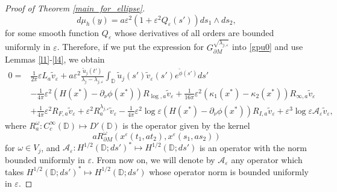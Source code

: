 \documentclass[12pt,a4paper]{amsart}
\numberwithin{equation}{section}
\theoremstyle{plain}
\theoremstyle{definition}
\newcommand{\D}{\mathbb{D}}
\newcommand{\A}{\mathcal A}
\begin{document}
\begin{proof}[Proof of Theorem \ref{main_for_ellipse}]
	\begin{equation}\label{volform}
		d\mu_h(y) = a \varepsilon^2 (1 + \varepsilon^2Q_\varepsilon(s')) ds_1 \wedge ds_2,
	\end{equation}
	for some smooth function $Q_\varepsilon$ whose derivatives of all orders are bounded uniformly in $\varepsilon$. Therefore, if we put the expression for $G^{\sqrt{\lambda_{j,\varepsilon}}}_{\partial M}$ into \eqref{gpu0} and use Lemmas \ref{l1}-\ref{l4}, we obtain
	\begin{align}\label{after coord system}
		0 =&\frac{1}{2\pi} \varepsilon L_a\tilde{v}_\varepsilon + a\varepsilon^2\frac{\tilde{u}_j(t')}{\lambda_j - \lambda_{j,\varepsilon}} \int_{\mathbb{D}} \tilde{u}_j(s')\tilde{v}_\varepsilon(s')e^{\tilde{\phi}(s')}ds'\\
		\nonumber &  - \frac{1}{4\pi} \varepsilon^2 (H(x^*)-\partial_{\nu}\phi(x^*))R_{\log,a} \tilde{v}_\varepsilon + \frac{1}{16\pi} \varepsilon^2(\kappa_1(x^*) - \kappa_2(x^*)) R_{\infty,a} \tilde{v}_\varepsilon \\
		\nonumber 
        & + \frac{1}{4\pi} \varepsilon ^2 R_{F,a}\tilde{v}_\varepsilon + \varepsilon^2 R_a^{\lambda_{j,\varepsilon}}\tilde{v}_\varepsilon - \frac{1}{4\pi} \varepsilon^2\log\varepsilon(H(x^*)-\partial_{\nu}\phi(x^*)) R_{I,a}\tilde{v}_\varepsilon + \varepsilon^3\log\varepsilon\mathcal{A}_\varepsilon\tilde{v}_{\varepsilon},
	\end{align}
	where $R_a^{\omega}: C_c^\infty(\mathbb{D}) \mapsto D'(\mathbb{D})$ is the operator given by the kernel $$aR_{\partial M}^{\omega}(x^{\varepsilon}(t_1,at_2),x^{\varepsilon}(s_1,as_2))$$ 
	for $\omega \in V_j$, and $\A_\varepsilon : H^{1/2}(\D; ds')^* \mapsto H^{1/2}(\D; ds')$ is an operator with the norm bounded uniformly in $\varepsilon$. From now on, we will denote by $\A_\varepsilon$ any operator which takes $H^{1/2}(\D ;ds')^* \mapsto H^{1/2}(\D; ds')$ whose operator norm is bounded uniformly in $\varepsilon$.
	

\end{proof}
\end{document}

